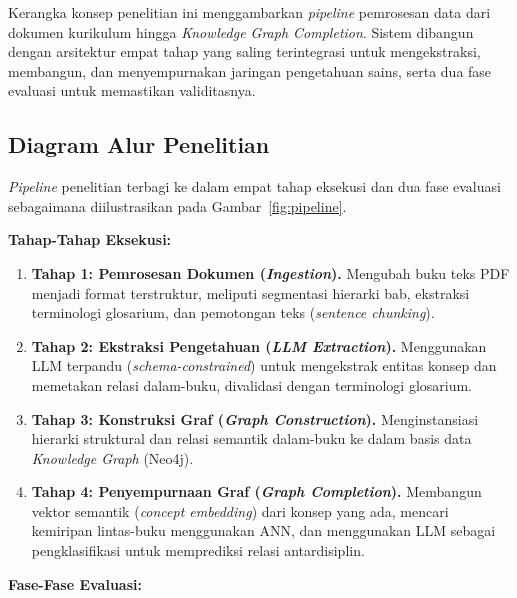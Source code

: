 \documentclass[main]{subfiles}
\begin{document}
Kerangka konsep penelitian ini menggambarkan \textit{pipeline}
pemrosesan data dari dokumen kurikulum hingga \textit{Knowledge Graph
Completion}. Sistem dibangun dengan arsitektur empat tahap yang saling
terintegrasi untuk mengekstraksi, membangun, dan menyempurnakan jaringan
pengetahuan sains, serta dua fase evaluasi untuk memastikan validitasnya.

\subsection{Diagram Alur Penelitian}

\textit{Pipeline} penelitian terbagi ke dalam empat tahap eksekusi dan
dua fase evaluasi sebagaimana diilustrasikan pada
Gambar~\ref{fig:pipeline}.



\noindent\textbf{Tahap-Tahap Eksekusi:}

\begin{enumerate}
  \item \textbf{Tahap 1: Pemrosesan Dokumen (\textit{Ingestion}).}
        Mengubah buku teks PDF menjadi format terstruktur, meliputi
        segmentasi hierarki bab, ekstraksi terminologi glosarium, dan
        pemotongan teks (\textit{sentence chunking}).

  \item \textbf{Tahap 2: Ekstraksi Pengetahuan (\textit{LLM
        Extraction}).} Menggunakan LLM terpandu
        (\textit{schema-constrained}) untuk mengekstrak entitas konsep
        dan memetakan relasi dalam-buku, divalidasi dengan terminologi
        glosarium.

  \item \textbf{Tahap 3: Konstruksi Graf (\textit{Graph
        Construction}).} Menginstansiasi hierarki struktural dan relasi
        semantik dalam-buku ke dalam basis data \textit{Knowledge Graph}
        (Neo4j).

  \item \textbf{Tahap 4: Penyempurnaan Graf (\textit{Graph
        Completion}).} Membangun vektor semantik (\textit{concept
        embedding}) dari konsep yang ada, mencari kemiripan lintas-buku
        menggunakan ANN, dan menggunakan LLM sebagai pengklasifikasi
        untuk memprediksi relasi antardisiplin.
\end{enumerate}

\noindent\textbf{Fase-Fase Evaluasi:}
\end{document}
